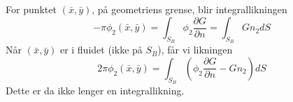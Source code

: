 For punktet $(\bar{x},\bar{y})$, på geometriens grense, blir integrallikningen
\begin{equation}
    -\pi \phi_2(\bar{x},\bar{y})  = \int_{S_B}  \phi_2  \frac{\partial G }{\partial n} = \int_{S_B}  G n_2 dS \label{142}
\end{equation}
Når $(\bar{x},\bar{y})$ er i fluidet (ikke på $S_B$), får vi likningen
\begin{equation}\label{eq:143}
    2\pi \phi_2(\bar{x},\bar{y})  = \int_{S_B}  ( \phi_2  \frac{\partial G }{\partial n}-G n_2 )dS 
\end{equation}
Dette er da ikke lenger en integrallikning.